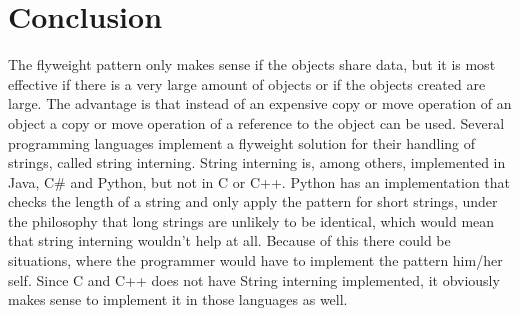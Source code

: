 \FloatBarrier
\section{Conclusion}
The flyweight pattern only makes sense 
if the objects share data, but it is most effective if there is a very large amount of objects or if the objects created are large.
The advantage is that instead of an expensive copy or move operation of an object a copy or move operation of a reference to the object can be used.
Several programming languages implement a flyweight solution for their handling of strings, called string interning.
String interning is, among others, implemented in Java, C\# and Python, but not in C or C++. Python has an implementation that checks the length of a string and only apply the pattern for short strings, under the philosophy that long strings are unlikely to be identical, which would mean that string interning wouldn't help at all. Because of this there could be situations, where the programmer would have to implement the pattern him/her self.
Since C and C++ does not have String interning implemented, it obviously makes sense to implement it in those languages as well.
